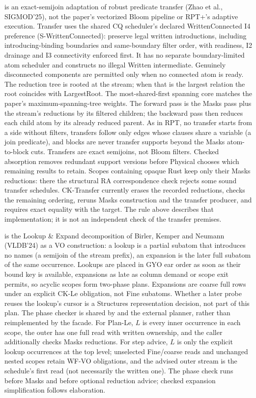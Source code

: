  is an exact-semijoin adaptation of robust predicate
transfer (Zhao et al., SIGMOD'25), not the paper's vectorized Bloom pipeline or
RPT+'s adaptive execution. Transfer uses the shared CQ scheduler's declared
WrittenConnected I4 preference (S-WrittenConnected): preserve legal written
introductions, including introducing-binding boundaries and same-boundary
filter order, with readiness, I2 drainage and I3 connectivity enforced first.
It has no separate boundary-limited atom scheduler and constructs no illegal
Written intermediate. Genuinely disconnected components are permitted only
when no connected atom is ready.
The reduction tree is rooted at the stream;
when that is the largest relation the root coincides with LargestRoot.
The most-shared-first spanning core matches the paper's maximum-spanning-tree weights.
The forward pass is the Masks pass plus the stream's reductions by its filtered
children; the backward pass then reduces each child atom by its already reduced
parent. As in RPT, no transfer starts from a side without filters, transfers
follow only edges whose clauses share a variable (a join predicate), and blocks
are never transfer supports beyond the Masks atom-to-block cuts. Transfers are
exact semijoins, not Bloom filters. Checked absorption removes redundant support
versions before Physical chooses which remaining results to retain. Scopes containing
opaque Rust keep only their Masks reductions: there the structural RA
correspondence check rejects some sound transfer schedules.
CK-Transfer currently erases the recorded reductions, checks the remaining
ordering, reruns Masks construction and the transfer producer, and requires
exact equality with the target. The rule above describes that implementation;
it is not an independent check of the transfer premises.

 is the Lookup \& Expand decomposition of Birler, Kemper and
Neumann (VLDB'24) as a VO construction: a lookup is a partial subatom that
introduces no names (a semijoin of the stream prefix), an expansion is the
later full subatom of the same occurrence. Lookups are placed in GYO ear order
as soon as their bound key is available, expansions as late as column demand
or scope exit permits, so acyclic scopes form two-phase plans.
Expansions are coarse full rows under an explicit CK-Le obligation, not Fine
subatoms. Whether a later probe reuses the lookup's cursor is a Structures
representation decision, not part of this plan.
The phase checker is shared by  and the external planner, rather
than reimplemented by the facade. For Plan-Le, $L$ is every inner occurrence
in each scope, the outer has one full read with written ownership, and the
caller additionally checks Masks reductions. For step advice, $L$ is only the
explicit lookup occurrences at the top level; unselected Fine/coarse reads and
unchanged nested scopes retain WF-VO obligations, and the advised outer stream
is the schedule's first read (not necessarily the written one). The phase check
runs before Masks and before optional reduction advice; checked expansion
simplification follows elaboration.

